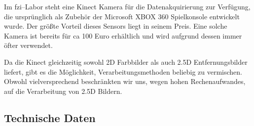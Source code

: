 Im \gls{fzi}--Labor steht eine Kinect Kamera für die Datenakquirierung zur
 Verfügung, die ursprünglich als Zubehör der Microsoft XBOX 360 Spielkonsole
 entwickelt wurde. Der größte Vorteil dieses Sensors liegt in seinem Preis. Eine
 solche Kamera ist bereits für ca 100 Euro erhältlich und wird aufgrund dessen
 immer öfter verwendet.
 
Da die Kinect gleichzeitig sowohl 2D Farbbilder als auch 2.5D Entfernungsbilder liefert, gibt es die Möglichkeit, Verarbeitungsmethoden beliebig zu vermischen.
 Obwohl vielversprechend beschränkten wir uns, wegen hohen Rechenaufwandes, auf
 die Verarbeitung von 2.5D Bildern.
\vspace{0.3cm}

\subsection{Technische Daten}
\label{kinect_umsetzung_technische_daten}
\authorsection{\editorhamza}

